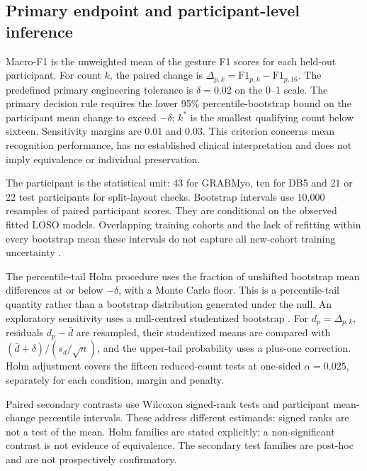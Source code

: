 \subsection{Primary endpoint and participant-level inference}
Macro-F1 is the unweighted mean of the gesture F1 scores for each held-out participant. For count $k$, the paired change is $\Delta_{p,k}=\mathrm{F1}_{p,k}-\mathrm{F1}_{p,16}$. The predefined primary engineering tolerance is $\delta=0.02$ on the 0--1 scale. The primary decision rule requires the lower 95\% percentile-bootstrap bound on the participant mean change to exceed $-\delta$; $k^*$ is the smallest qualifying count below sixteen. Sensitivity margins are 0.01 and 0.03. This criterion concerns mean recognition performance, has no established clinical interpretation and does not imply equivalence or individual preservation.

The participant is the statistical unit: 43 for GRABMyo, ten for DB5 and 21 or 22 test participants for split-layout checks. Bootstrap intervals use 10,000 resamples of paired participant scores. They are conditional on the observed fitted LOSO models. Overlapping training cohorts and the lack of refitting within every bootstrap mean these intervals do not capture all new-cohort training uncertainty \citep{bengio2004variance}.

The percentile-tail Holm procedure uses the fraction of unshifted bootstrap mean differences at or below $-\delta$, with a Monte Carlo floor. This is a percentile-tail quantity rather than a bootstrap distribution generated under the null. An exploratory sensitivity uses a null-centred studentized bootstrap \citep{davison1997bootstrap}. For $d_p=\Delta_{p,k}$, residuals $d_p-\bar d$ are resampled, their studentized means are compared with $(\bar d+\delta)/(s_d/\sqrt n)$, and the upper-tail probability uses a plus-one correction. Holm adjustment covers the fifteen reduced-count tests at one-sided $\alpha=0.025$, separately for each condition, margin and penalty.

Paired secondary contrasts use Wilcoxon signed-rank tests and participant mean-change percentile intervals. These address different estimands: signed ranks are not a test of the mean. Holm families are stated explicitly; a non-significant contrast is not evidence of equivalence. The secondary test families are post-hoc and are not prospectively confirmatory.

